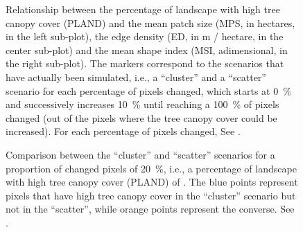 \documentclass[10pt,letterpaper]{article}
\begin{document}
\begin{figure}[ht]
  \begin{adjustwidth}{-.4\textwidth}{0cm}
    \centering
    \caption{\label{fig:scenario-metrics} Relationship between the percentage of landscape with high tree canopy cover (PLAND) and the mean patch size (MPS, in hectares, in the left sub-plot), the edge density (ED, in m / hectare, in the center sub-plot) and the mean shape index (MSI, adimensional, in the right sub-plot). The markers correspond to the scenarios that have actually been simulated, i.e., a ``cluster'' and a ``scatter'' scenario for each percentage of pixels changed, which starts at 0~\% and successively increases 10~\% until reaching a 100~\% of pixels changed (out of the pixels where the tree canopy cover could be increased). For each percentage of pixels changed, See .}
  \end{adjustwidth}
\end{figure}



\begin{figure}[ht]
  \begin{adjustwidth}{-.4\textwidth}{0cm}
    \centering
    \caption{\label{fig:scenario-maps} Comparison between the ``cluster'' and ``scatter'' scenarios for a proportion of changed pixels of 20~\%, i.e., a percentage of landscape with high tree canopy cover (PLAND) of . The blue points represent pixels that have high tree canopy cover in the ``cluster'' scenario but not in the ``scatter'', while orange points represent the converse. See .}
  \end{adjustwidth}
\end{figure}
  
\end{document}
